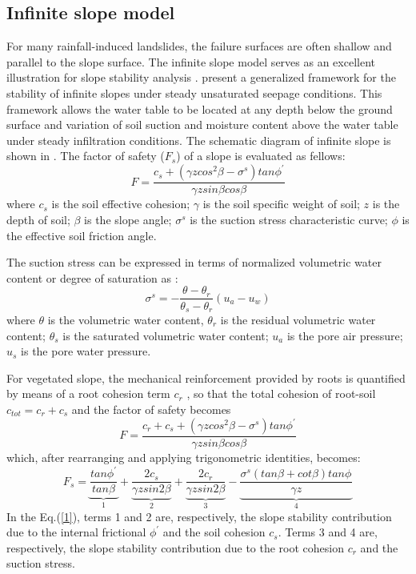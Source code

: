 \subsection{Infinite slope model}

For many rainfall-induced landslides, the failure surfaces are often shallow and parallel to the slope surface. The infinite slope model serves as an excellent illustration for slope stability analysis \citep{lu2013hill,Cho2002Eva}.
\cite{Lu2008Infinite} present a generalized framework for the stability of infinite slopes under steady unsaturated seepage conditions. This framework allows the water table to be located at any depth below the ground surface and variation of soil suction and moisture content above the water table under steady infiltration conditions. The schematic diagram of infinite slope is shown in . The factor of safety ($F_s$) of a slope is evaluated as fellows:
\begin{equation}F=\frac{c_s+(\gamma z cos^2 \beta - \sigma^s) tan \phi^{'} }{\gamma z sin \beta cos \beta} \end{equation}
where $c_s$ is the soil effective cohesion; $\gamma$ is the soil specific weight of soil; $z$ is the depth of soil; $\beta$ is the slope angle; $\sigma^{s}$ is the suction stress characteristic curve; $\phi$ is the effective soil friction angle.

The suction stress can be expressed in terms of normalized volumetric water content or degree of saturation as \citep{Lu2008Infinite}:
\begin{equation}\sigma^s = -\frac{\theta-\theta_r}{\theta_s-\theta_r}(u_a-u_w)\end{equation}
where $\theta$ is the volumetric water content, $\theta_r$ is the residual volumetric water content; $\theta_s$ is the saturated volumetric water content; $u_a$ is the pore air pressure; $u_s$ is the pore water pressure.



For vegetated slope, the mechanical reinforcement provided by roots is quantified by means of a root cohesion term $c_r$ \citep{Pollen2007Temporal,Arnone2016Modeling}, so that the total cohesion of root-soil $c_{tot} = c_r+c_s$ and the factor of safety becomes
\begin{equation}F=\frac{c_r+c_s+(\gamma z cos^2 \beta - \sigma^s) tan \phi^{'} }{\gamma z sin \beta cos \beta} \end{equation}
which, after rearranging and applying trigonometric identities, becomes:
\begin{equation}F_s=\underbrace{\frac{tan\phi^{'}}{tan\beta}}_{1}+\underbrace{\frac{2c_s}{\gamma z sin2\beta}}_{2}+\underbrace{\frac{2c_r}{\gamma z sin2\beta}}_{3} 
-\underbrace{\frac{\sigma^s(tan\beta+cot\beta)tan\phi^{}}{\gamma z}}_{4}\label{1}\end{equation}
In the Eq.(\ref{1}), terms 1 and 2 are, respectively, the slope stability contribution due to the internal frictional $\phi^{'}$ and the soil cohesion $c_s$. Terms 3 and 4 are, respectively, the slope stability contribution due to the root cohesion $c_r$ and the suction stress.

